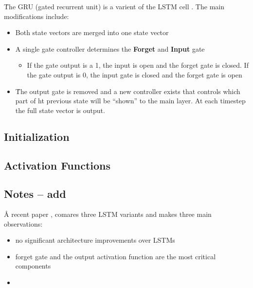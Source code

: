 \r{The GRU (gated recurrent unit) is a varient of the LSTM cell . The main modifications include:}

\begin{itemize}[noitemsep,topsep=0pt]
	\item Both state vectors are merged into one state vector
	\item A single gate controller determines the \textbf{Forget} and \textbf{Input} gate
	\begin{itemize}[noitemsep,topsep=0pt]
		\item If the gate output is a 1, the input is open and the forget gate is closed. If the gate output is 0, the input gate is closed and the forget gate is open
	\end{itemize}
	\item \r{The output gate is removed and a new controller exists that controls which part of ht previous state will be ``shown'' to the main layer}. At each timestep the full state vector is output.
\end{itemize}



\subsection{Initialization}

\subsection{Activation Functions}

\subsection{Notes -- add}

\r{A recent paper , comares three LSTM variants and makes three main observations:}

\begin{itemize}[noitemsep,topsep=0pt]
	\item no significant architecture improvements over LSTMs
	\item forget gate and the output activation function are the most critical components
	\item {}
\end{itemize}










